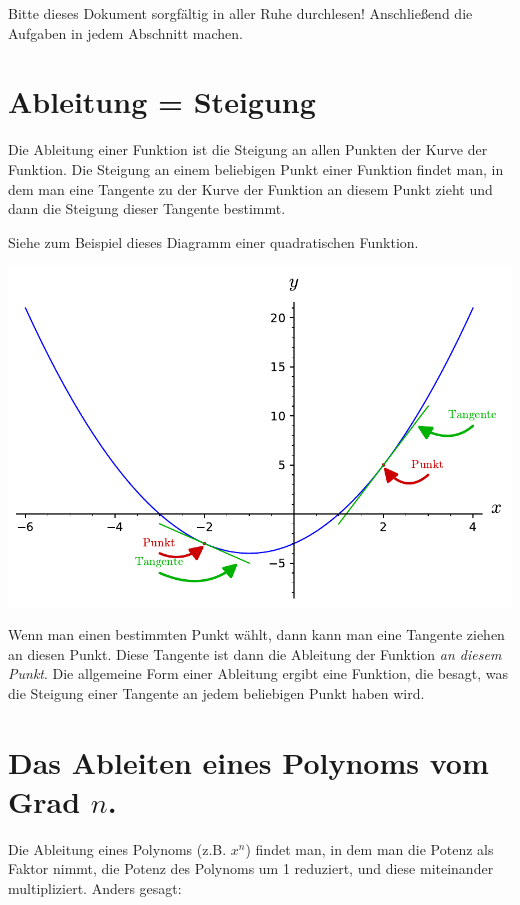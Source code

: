 \documentclass{scrartcl}
\begin{document}
Bitte dieses Dokument sorgfältig in aller Ruhe durchlesen!  Anschließend die
Aufgaben in jedem Abschnitt machen.

\section{Ableitung = Steigung}

Die Ableitung einer Funktion ist die Steigung an allen Punkten der Kurve der
Funktion.  Die Steigung an einem beliebigen Punkt einer Funktion findet man,
in dem man eine Tangente zu der Kurve der Funktion an diesem Punkt zieht und
dann die Steigung dieser Tangente bestimmt.

Siehe zum Beispiel dieses Diagramm einer quadratischen Funktion.

\includegraphics[width=\textwidth]{quadratic-with-tangents.pdf}

Wenn man einen bestimmten Punkt wählt, dann kann man eine Tangente ziehen an
diesen Punkt.  Diese Tangente ist dann die Ableitung der Funktion \emph{an
diesem Punkt}.  Die allgemeine Form einer Ableitung ergibt eine Funktion,
die besagt, was die Steigung einer Tangente an jedem beliebigen Punkt haben
wird.

\section{Das Ableiten eines Polynoms vom Grad $n$.}
\label{sec:ableiten-grad-n}

Die Ableitung eines Polynoms (z.B. $x^n$) findet man, in dem man die Potenz
als Faktor nimmt, die Potenz des Polynoms um 1 reduziert, und diese
miteinander multipliziert.  Anders gesagt:
\end{document}
